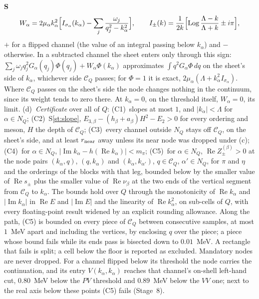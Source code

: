 \documentclass[11pt]{article}
\newcounter{stmt}
\newenvironment{stmt}[1]{\par\smallskip\refstepcounter{stmt}\noindent\textbf{S\thestmt}\enspace[\textsf{#1}]\enspace\ignorespaces}{\par\smallskip}
\newcommand{\Sr}[1]{S\ref{#1}}
\begin{document}
\begin{stmt}{definition}
\[
W_\alpha=2\mu_\alpha k_\alpha^2\Bigl[I_{\sigma_\alpha}(k_\alpha)-\sum_j\frac{\omega_j}{q_j^2-k_\alpha^2}\Bigr],\qquad I_\pm(k)=\frac1{2k}\Bigl[\operatorname{Log}\frac{\Lambda-k}{\Lambda+k}\pm i\pi\Bigr],
\]
$+$ for a flipped channel (the value of an integral passing below $k_\alpha$) and $-$ otherwise. In a subtracted channel the sheet enters only through this sign: $\sum_j\omega_jq_j^2G_\alpha(q_j)\Phi(q_j)+W_\alpha\Phi(k_\alpha)$ approximates $\int q^2G_\alpha\Phi\,dq$ on the sheet's side of $k_\alpha$, whichever side $\mathcal C_Q$ passes; for $\Phi=1$ it is exact, $2\mu_\alpha(\Lambda+k_\alpha^2I_{\sigma_\alpha})$. Where $\mathcal C_Q$ passes on the sheet's side the node changes nothing in the continuum, since its weight tends to zero there. At $k_\alpha=0$, on the threshold itself, $W_\alpha=0$, its limit.
(d)~\emph{Certificate} over all of $Q$: (C1)~slopes at most $1$, and $|k_\alpha|<\Lambda$ for $\alpha\in N_Q$; (C2)~\Sr{st:slope}, $E_{3,\beta}-(h_\beta+a_\beta)H^2-E_2>0$ for every ordering and meson, $H$ the depth of $\mathcal C_Q$; (C3)~every channel outside $N_Q$ stays off $\mathcal C_Q$, on the sheet's side, and at least $r_{\rm near}$ away unless its near node was dropped under (c); (C4)~for $\alpha\in N_Q$, $|\operatorname{Im}k_\alpha-h(\operatorname{Re}k_\alpha)|<m_\pi$; (C5)~for $\alpha\in N_Q$, $\operatorname{Re}Z^{(\beta)}_\pm>0$ at the node pairs $(k_\alpha,q)$, $(q,k_\alpha)$ and $(k_\alpha,k_{\alpha'})$, $q\in\mathcal C_Q$, $\alpha'\in N_Q$, for $\pi$ and $\eta$ and the orderings of the blocks with that leg, bounded below by the smaller value of $\operatorname{Re}s_\pm$ plus the smaller value of $\operatorname{Re}\nu_\beta$ at the two ends of the vertical segment from $\mathcal C_Q$ to $k_\alpha$. The bounds hold over $Q$ through the monotonicity of $\operatorname{Re}k_\alpha$ and $|\operatorname{Im}k_\alpha|$ in $\operatorname{Re}E$ and $|\operatorname{Im}E|$ and the linearity of $\operatorname{Re}k_\alpha^2$, on sub-cells of $Q$, with every floating-point result widened by an explicit rounding allowance. Along the path, (C5) is bounded on every piece of $\mathcal C_Q$ between consecutive samples, at most $1$~MeV apart and including the vertices, by enclosing $q$ over the piece; a piece whose bound fails while its ends pass is bisected down to $0.01$~MeV. A rectangle that fails is split; a cell below the floor is reported as excluded. Mandatory nodes are never dropped. For a channel flipped below its threshold the node carries the continuation, and its entry $V(k_\alpha,k_\alpha)$ reaches that channel's on-shell left-hand cut, $0.80$~MeV below the $PV$ threshold and $0.89$~MeV below the $VV$ one; next to the real axis below these points (C5) fails (Stage~8).

\end{stmt}
\end{document}
